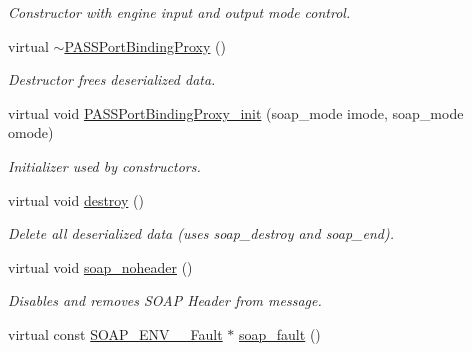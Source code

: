 \begin{DoxyCompactItemize}
\begin{DoxyCompactList}\small\item\em Constructor with engine input and output mode control. \item\end{DoxyCompactList}\item 
\hypertarget{classPASSPortBindingProxy_a475f3ab4595c1688bf957b7f2ce45225}{
virtual \hyperlink{classPASSPortBindingProxy_a475f3ab4595c1688bf957b7f2ce45225}{$\sim$PASSPortBindingProxy} ()}
\label{classPASSPortBindingProxy_a475f3ab4595c1688bf957b7f2ce45225}

\begin{DoxyCompactList}\small\item\em Destructor frees deserialized data. \item\end{DoxyCompactList}\item 
\hypertarget{classPASSPortBindingProxy_ae4f022b99a880bb07a57463679ebd020}{
virtual void \hyperlink{classPASSPortBindingProxy_ae4f022b99a880bb07a57463679ebd020}{PASSPortBindingProxy\_\-init} (soap\_\-mode imode, soap\_\-mode omode)}
\label{classPASSPortBindingProxy_ae4f022b99a880bb07a57463679ebd020}

\begin{DoxyCompactList}\small\item\em Initializer used by constructors. \item\end{DoxyCompactList}\item 
\hypertarget{classPASSPortBindingProxy_a06b4c13dc9e49f9b2ab2996302116972}{
virtual void \hyperlink{classPASSPortBindingProxy_a06b4c13dc9e49f9b2ab2996302116972}{destroy} ()}
\label{classPASSPortBindingProxy_a06b4c13dc9e49f9b2ab2996302116972}

\begin{DoxyCompactList}\small\item\em Delete all deserialized data (uses soap\_\-destroy and soap\_\-end). \item\end{DoxyCompactList}\item 
\hypertarget{classPASSPortBindingProxy_ad3ec0ac7773b78400f6211ea820d6e7a}{
virtual void \hyperlink{classPASSPortBindingProxy_ad3ec0ac7773b78400f6211ea820d6e7a}{soap\_\-noheader} ()}
\label{classPASSPortBindingProxy_ad3ec0ac7773b78400f6211ea820d6e7a}

\begin{DoxyCompactList}\small\item\em Disables and removes SOAP Header from message. \item\end{DoxyCompactList}\item 
\hypertarget{classPASSPortBindingProxy_a5181c414e1b86bc06aca1bc7064091b5}{
virtual const \hyperlink{structSOAP__ENV____Fault}{SOAP\_\-ENV\_\-\_\-Fault} $\ast$ \hyperlink{classPASSPortBindingProxy_a5181c414e1b86bc06aca1bc7064091b5}{soap\_\-fault} ()}
\label{classPASSPortBindingProxy_a5181c414e1b86bc06aca1bc7064091b5}


\end{DoxyCompactItemize}
